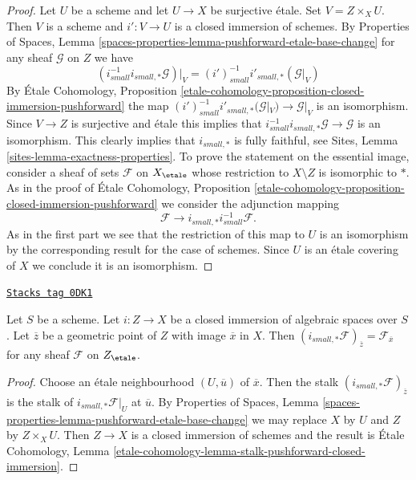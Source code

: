 \begin{proof}
Let $U$ be a scheme and let $U \to X$ be surjective \'etale.
Set $V = Z \times_X U$. Then $V$ is a scheme and $i' : V \to U$ is
a closed immersion of schemes. By
Properties of Spaces,
Lemma \ref{spaces-properties-lemma-pushforward-etale-base-change}
for any sheaf $\mathcal{G}$ on $Z$ we have
$$
(i_{small}^{-1}i_{small, *}\mathcal{G})|_V =
(i')_{small}^{-1}i'_{small, *}(\mathcal{G}|_V)
$$
By
\'Etale Cohomology, Proposition
\ref{etale-cohomology-proposition-closed-immersion-pushforward}
the map
$(i')_{small}^{-1}i'_{small, *}(\mathcal{G}|_V) \to \mathcal{G}|_V$
is an isomorphism. Since $V \to Z$ is surjective and \'etale this implies
that $i_{small}^{-1}i_{small, *}\mathcal{G} \to \mathcal{G}$ is an
isomorphism. This clearly implies that $i_{small, *}$ is fully faithful, see
Sites, Lemma \ref{sites-lemma-exactness-properties}.
To prove the statement on the essential image, consider a sheaf of sets
$\mathcal{F}$ on $X_\etale$ whose restriction to $X \setminus Z$ is
isomorphic to $*$. As in the proof of
\'Etale Cohomology, Proposition
\ref{etale-cohomology-proposition-closed-immersion-pushforward}
we consider the adjunction mapping
$$
\mathcal{F} \longrightarrow i_{small, *}i_{small}^{-1}\mathcal{F}.
$$
As in the first part we see that the restriction of this map to
$U$ is an isomorphism by the corresponding result for the case of
schemes. Since $U$ is an \'etale covering of $X$ we
conclude it is an isomorphism.
\end{proof}

\begin{lemma}
\label{spaces-morphisms-lemma-stalk-push-closed}
\href{https://stacks.math.columbia.edu/tag/0DK1}{\texttt{Stacks tag 0DK1}}

Let $S$ be a scheme. Let $i : Z \to X$ be a closed immersion of algebraic
spaces over $S$. Let $\overline{z}$ be a geometric point of $Z$ with
image $\overline{x}$ in $X$. Then
$(i_{small, *}\mathcal{F})_{\overline{z}} = \mathcal{F}_{\overline{x}}$
for any sheaf $\mathcal{F}$ on $Z_\etale$.
\end{lemma}

\begin{proof}
Choose an \'etale neighbourhood $(U, \overline{u})$ of $\overline{x}$.
Then the stalk $(i_{small, *}\mathcal{F})_{\overline{z}}$
is the stalk of $i_{small, *}\mathcal{F}|_U$ at $\overline{u}$.
By Properties of Spaces,
Lemma \ref{spaces-properties-lemma-pushforward-etale-base-change}
we may replace $X$ by $U$ and $Z$ by $Z \times_X U$.
Then $Z \to X$ is a closed immersion of schemes and the result is
\'Etale Cohomology, Lemma
\ref{etale-cohomology-lemma-stalk-pushforward-closed-immersion}.
\end{proof}

